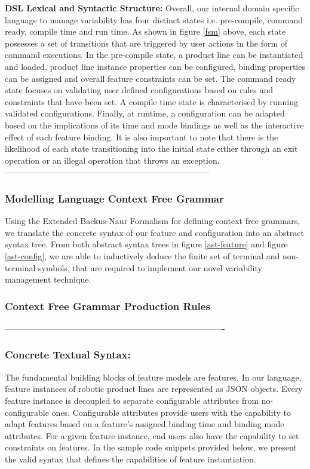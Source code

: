 \textbf{DSL Lexical and Syntactic Structure: }Overall, our internal domain specific language to manage variability has four distinct states i.e. pre-compile, command ready, compile time and run time. As shown in figure \ref{fsm} above, each state possesses a set of transitions that are triggered by user actions in the form of command executions. In the pre-compile state, a product line can be instantiated and loaded, product line instance properties can be configured, binding properties can be assigned and overall feature constraints can be set. The command ready state focuses on validating user defined configurations based on rules and constraints that have been set. A compile time state is characterised by running validated configurations. Finally, at runtime, a configuration can be adapted based on the implications of its time and mode bindings as well as the interactive effect of each feature binding. It is also important to note that there is the likelihood of each state transitioning into the initial state either through an exit operation or an illegal operation that throws an exception.
--------------------------------------------------------------------------

\subsubsection{Modelling Language Context Free Grammar}
Using the Extended Backus-Naur Formalism for defining context free grammars, we translate the concrete syntax of our feature and configuration into an abstract syntax tree. From both abstract syntax trees in figure \ref{ast-feature} and figure \ref{ast-config},  we are able to inductively deduce the finite set of terminal and non-terminal symbols, that are required to implement our novel variability management technique.

\subsubsection{Context Free Grammar Production Rules}
-------------------------------------------------------------------------------
\subsubsection{Concrete Textual Syntax: }The fundamental building blocks of feature models are features. In our language, feature instances of robotic product lines are represented as JSON objects. Every feature instance is decoupled to separate configurable attributes from no-configurable ones. Configurable attributes provide users with the capability to adapt features based on a feature's assigned binding time and binding mode attributes. For a given feature instance, end users also have the capability to set constraints on features. In the sample code snippets provided below, we present the valid syntax that defines the capabilities of feature instantiation.

